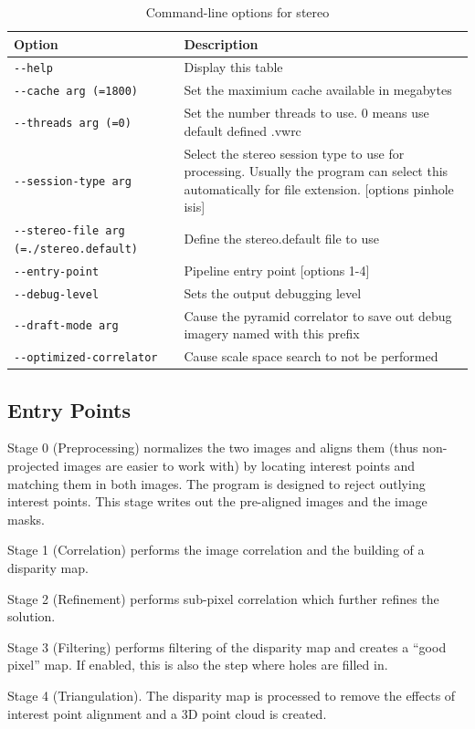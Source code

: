 \begin{longtable}{|l|p{10cm}|}
\caption{Command-line options for stereo}
\label{tbl:stereo}
\endfirsthead
\endhead
\endfoot
\endlastfoot
\hline
Option & Description \\ \hline \hline
\verb#--help# & Display this table\\ \hline
\verb#--cache arg (=1800)# & Set the maximium cache available in megabytes\\ \hline
\verb#--threads arg (=0)# & Set the number threads to use. 0 means use default defined .vwrc\\ \hline
\verb#--session-type arg# & Select the stereo session type to use for processing. Usually the program can select this automatically for file extension. [options pinhole isis]\\ \hline
\verb#--stereo-file arg (=./stereo.default)# & Define the stereo.default file to use\\ \hline
\verb#--entry-point# & Pipeline entry point [options 1-4]\\ \hline
\verb#--debug-level# & Sets the output debugging level\\ \hline
\verb#--draft-mode arg# & Cause the pyramid correlator to save out debug imagery named with this prefix\\ \hline
\verb#--optimized-correlator# & Cause scale space search to not be performed\\ \hline
\end{longtable}

\subsection{Entry Points}
\label{entrypoints}

Stage 0 (Preprocessing) normalizes the two images and aligns them
(thus non-projected images are easier to work with) by locating
interest points and matching them in both images. The program is
designed to reject outlying interest points.  This stage writes out
the pre-aligned images and the image masks.

Stage 1 (Correlation) performs the image correlation and the building
of a disparity map.

Stage 2 (Refinement) performs sub-pixel correlation which further
refines the solution.

Stage 3 (Filtering) performs filtering of the disparity map and
creates a ``good pixel'' map.  If enabled, this is also the step
where holes are filled in.

Stage 4 (Triangulation). The disparity map is processed to remove
the effects of interest point alignment and a 3D point cloud is
created.

